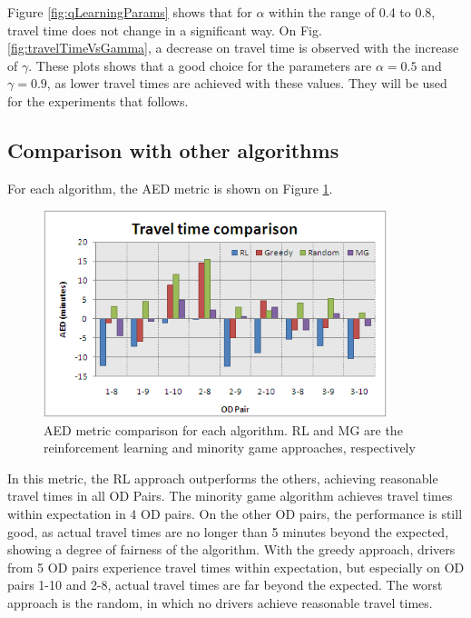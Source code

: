 \documentclass{RITA}
\begin{document}
Figure \ref{fig:qLearningParams} shows that for $\alpha$ within the range of 0.4 to 0.8, travel time does not change in a significant way. On Fig. \ref{fig:travelTimeVsGamma}, a decrease on travel time is observed with the increase of $\gamma$. These plots shows that a good choice for the parameters are $\alpha = 0.5$ and $\gamma = 0.9$, as lower travel times are achieved with these values. They will be used for the experiments that follows.

\subsection{Comparison with other algorithms}

For each algorithm, the AED metric is shown on Figure \ref{fig:travelTimeComparison}. 

\begin{figure}[ht]
    \centerline{\includegraphics[width=10cm]{img/travelTimeComparison.png}}
    \caption{AED metric comparison for each algorithm. RL and MG are the reinforcement learning and minority game approaches, respectively}
    \label{fig:travelTimeComparison}
\end{figure}

In this metric, the RL approach outperforms the others, achieving reasonable travel times in all OD Pairs. The minority game algorithm achieves travel times within expectation in 4 OD pairs. On the other OD pairs, the performance is still good, as actual travel times are no longer than 5 minutes beyond the expected, showing a degree of fairness of the algorithm. With the greedy approach, drivers from 5 OD pairs experience travel times within expectation, but especially on OD pairs 1-10 and 2-8, actual travel times are far beyond the expected. The worst approach is the random, in which no drivers achieve reasonable travel times.
\end{document}
